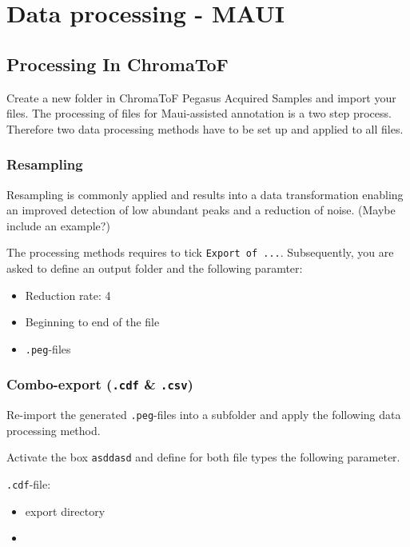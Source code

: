 \documentclass[]{book}
\providecommand{\tightlist}{%
  \setlength{\itemsep}{0pt}\setlength{\parskip}{0pt}}
\theoremstyle{definition}
\theoremstyle{definition}
\theoremstyle{definition}
\theoremstyle{remark}
\begin{document}

\chapter{Data processing - MAUI}\label{mauiproc}

\section{Processing In ChromaToF}\label{processing-in-chromatof}

Create a new folder in ChromaToF Pegasus Acquired Samples and import
your files. The processing of files for Maui-assisted annotation is a
two step process. Therefore two data processing methods have to be set
up and applied to all files.

\subsection{Resampling}\label{resampling}

Resampling is commonly applied and results into a data transformation
enabling an improved detection of low abundant peaks and a reduction of
noise. (Maybe include an example?)

The processing methods requires to tick \texttt{Export\ of\ ...}.
Subsequently, you are asked to define an output folder and the following
paramter:

\begin{itemize}
\tightlist
\item
  Reduction rate: 4
\item
  Beginning to end of the file
\item
  \texttt{.peg}-files
\end{itemize}

\subsection{\texorpdfstring{Combo-export (\texttt{.cdf} \&
\texttt{.csv})}{Combo-export (.cdf \& .csv)}}\label{combo-export-.cdf-.csv}

Re-import the generated \texttt{.peg}-files into a subfolder and apply
the following data processing method.

Activate the box \texttt{asddasd} and define for both file types the
following parameter.

\texttt{.cdf}-file:

\begin{itemize}
\item
  export directory
\item
\end{itemize}
\end{document}
